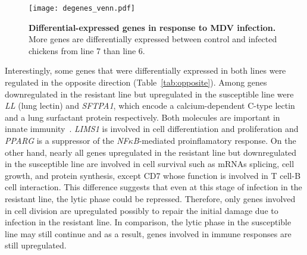 \begin{figure}[!ht]
    \begin{center}
        \texttt{[image: degenes\_venn.pdf]}
    \end{center}
    \caption{
        \textbf{Differential-expressed genes in response to MDV
        infection.}
        More genes are differentially expressed between control
        and infected chickens from line 7 than line 6.
    }
    \label{degenes_venn_diagram}
\end{figure}

Interestingly, some genes that were differentially expressed in
both lines were regulated in the opposite direction
(Table~\ref{tab:opposite}).  Among genes downregulated in the
resistant line but upregulated in the susceptible line were {\em
LL} (lung lectin) and {\em SFTPA1}, which encode a
calcium-dependent C-type lectin and a lung surfactant protein
respectively.  Both molecules are important in innate
immunity~\cite{hogenkamp2008chicken,kingma2006defense}.  {\em
LIMS1} is involved in cell differentiation and proliferation and
{\em PPARG} is a suppressor of the {\em NF$\kappa$B}-mediated
proinflamatory response.  On the other hand, nearly all genes
upregulated in the resistant line but downregulated in the
susceptible line are involved in cell survival such as mRNAs
splicing, cell growth, and protein synthesis, except CD7 whose
function is involved in T cell-B cell interaction.  This
difference suggests that even at this stage of infection in the
resistant line, the lytic phase could be repressed. Therefore,
only genes involved in cell division are upregulated possibly to
repair the initial damage due to infection in the resistant line.
In comparison, the lytic phase in the susceptible line may still
continue and as a result, genes involved in immune responses are
still upregulated.

